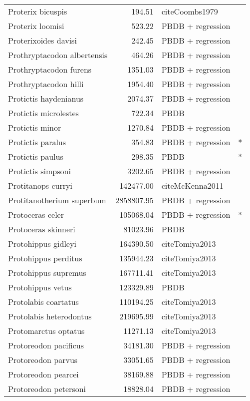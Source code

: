 \begin{table}[ht]
\begin{tabular}{lrll}
  Proterix bicuspis & 194.51 & cite{Coombs1979} &  \\ 
  Proterix loomisi & 523.22 & PBDB + regression &  \\ 
  Proterixoides davisi & 242.45 & PBDB + regression &  \\ 
  Prothryptacodon albertensis & 464.26 & PBDB + regression &  \\ 
  Prothryptacodon furens & 1351.03 & PBDB + regression &  \\ 
  Prothryptacodon hilli & 1954.40 & PBDB + regression &  \\ 
  Protictis haydenianus & 2074.37 & PBDB + regression &  \\ 
  Protictis microlestes & 722.34 & PBDB &  \\ 
  Protictis minor & 1270.84 & PBDB + regression &  \\ 
  Protictis paralus & 354.83 & PBDB + regression & * \\ 
  Protictis paulus & 298.35 & PBDB & * \\ 
  Protictis simpsoni & 3202.65 & PBDB + regression &  \\ 
  Protitanops curryi & 142477.00 & cite{McKenna2011} &  \\ 
  Protitanotherium superbum & 2858807.95 & PBDB + regression &  \\ 
  Protoceras celer & 105068.04 & PBDB + regression & * \\ 
  Protoceras skinneri & 81023.96 & PBDB &  \\ 
  Protohippus gidleyi & 164390.50 & cite{Tomiya2013} &  \\ 
  Protohippus perditus & 135944.23 & cite{Tomiya2013} &  \\ 
  Protohippus supremus & 167711.41 & cite{Tomiya2013} &  \\ 
  Protohippus vetus & 123329.89 & PBDB &  \\ 
  Protolabis coartatus & 110194.25 & cite{Tomiya2013} &  \\ 
  Protolabis heterodontus & 219695.99 & cite{Tomiya2013} &  \\ 
  Protomarctus optatus & 11271.13 & cite{Tomiya2013} &  \\ 
  Protoreodon pacificus & 34181.30 & PBDB + regression &  \\ 
  Protoreodon parvus & 33051.65 & PBDB + regression &  \\ 
  Protoreodon pearcei & 38169.88 & PBDB + regression &  \\ 
  Protoreodon petersoni & 18828.04 & PBDB + regression &  \\ 

\end{tabular}
\end{table}
